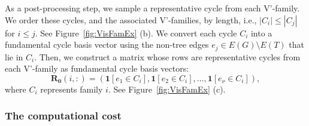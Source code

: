 \documentclass[fleqn,11pt]{article}
\newcommand\calF{\mathcal{F}}
\begin{document}
As a post-processing step, we sample a representative cycle from each V'-family. We order these cycles, and the associated V'-families, by length, i.e., $|C_i|\le |C_j|$ for $i\le j$. See Figure~\ref{fig:VisFamEx} (b). 
We convert each cycle $C_i$ into a fundamental cycle basis vector using the non-tree edges $e_j\in E(G)\setminus E(T)$ that lie in $C_i$. 
Then, we construct a matrix whose rows are representative cycles from each V'-family as fundamental cycle basis vectors:
\begin{equation}
	\bm{R_0}(i,:) = (\bm{1}[e_1{\in} C_i], \bm{1}[e_2{\in} C_i], \hdots, \bm{1}[e_\nu{\in} C_i]),%
	\label{eq:R0_def}
\end{equation}
where $C_i$ represents family $i$. 
See Figure~\ref{fig:VisFamEx} (c).

\subsubsection{The computational cost}
\end{document}
